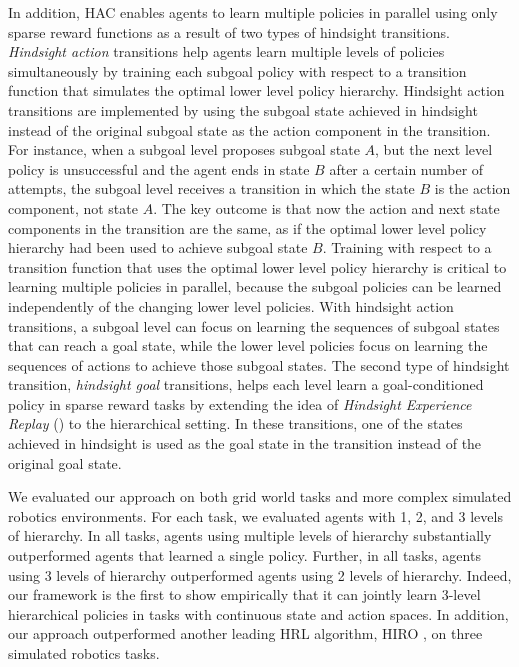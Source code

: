 \documentclass{article} %
\begin{document}
In addition, HAC enables agents to learn multiple policies in parallel using only sparse reward functions as a result of two types of hindsight transitions.  \textit{Hindsight action} transitions help agents learn multiple levels of policies simultaneously by training each subgoal policy with respect to a transition function that simulates the optimal lower level policy hierarchy.  Hindsight action transitions are implemented by using the subgoal state achieved in hindsight instead of the original subgoal state as the action component in the transition.  For instance, when a subgoal level proposes subgoal state $A$, but the next level policy is unsuccessful and the agent ends in state $B$ after a certain number of attempts, the subgoal level receives a transition in which the state $B$ is the action component, not state $A$.  The key outcome is that now the action and next state components in the transition are the same, as if the optimal lower level policy hierarchy had been used to achieve subgoal state $B$.  Training with respect to a transition function that uses the optimal lower level policy hierarchy is critical to learning multiple policies in parallel, because the subgoal policies can be learned independently of the changing lower level policies.  With hindsight action transitions, a subgoal level can focus on learning the sequences of subgoal states that can reach a goal state, while the lower level policies focus on learning the sequences of actions to achieve those subgoal states.  The second type of hindsight transition, \textit{hindsight goal} transitions, helps each level learn a goal-conditioned policy in sparse reward tasks by extending the idea of \textit{Hindsight Experience Replay} (\cite{Andrychowicz2017HindsightER}) to the hierarchical setting.  In these transitions, one of the states achieved in hindsight is used as the goal state in the transition instead of the original goal state.   

We evaluated our approach on both grid world tasks and more complex simulated robotics environments.  For each task, we evaluated agents with 1, 2, and 3 levels of hierarchy.  In all tasks, agents using multiple levels of hierarchy substantially outperformed agents that learned a single policy.  Further, in all tasks, agents using 3 levels of hierarchy outperformed agents using 2 levels of hierarchy.  Indeed, our framework is the first to show empirically that it can jointly learn 3-level hierarchical policies in tasks with continuous state and action spaces.  In addition, our approach outperformed another leading HRL algorithm, HIRO \citep{DBLP:journals/corr/abs-1805-08296}, on three simulated robotics tasks.
\end{document}
